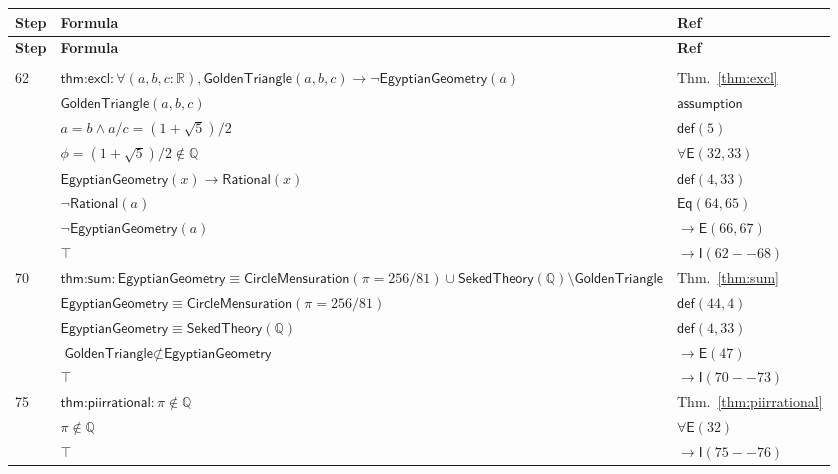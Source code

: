 \documentclass[12pt]{amsart}
\newcommand{\br}{,\allowbreak}
\newcommand{\R}{\mathbb{R}}
\newenvironment{prooftable}{%
	\renewcommand{\arraystretch}{1.2}%
	\setlength{\tabcolsep}{4pt}%
	\setlength{\arrayrulewidth}{0.05pt}
	\tiny
	\sloppy
	\begin{longtable}{
			|>{\centering\arraybackslash}m{0.7cm}|
			>{\raggedright\centering\arraybackslash}m{0.70\textwidth}|
			>{\centering\arraybackslash}m{3.5cm}|  %
		}%
		\hline
		\textbf{Step} & \centering\textbf{Formula} & \textbf{Ref} \\
		\hline
		\endfirsthead
		\hline
		\textbf{Step} & \centering\textbf{Formula} & \textbf{Ref} \\
		\hline
		\endhead
		\hline
		\multicolumn{3}{r}{\textit{Continued on next page}} \\
		\endfoot
		\hline
		\endlastfoot
	}{%
	\end{longtable}%
}
\newcommand{\thicksoliddoubleline}{%
	\noalign{\vskip1pt}%
	\noalign{\hrule height 0.2pt}%
	\noalign{\vskip0.2pt}%
	\noalign{\hrule height 0.2pt}%
	\noalign{\vskip1pt}%
}
\begin{document}
\begin{prooftable}
	\thicksoliddoubleline
	62 & $\textsf{thm:excl}: \forall(a \br b \br c:\R) \br  \textsf{GoldenTriangle}(a \br b \br c) \to \neg \textsf{EgyptianGeometry}(a)$ & Thm.~\ref{thm:excl} \\
	\hdashline
	63 & $\textsf{GoldenTriangle}(a \br b \br c)$ & $\mathsf{assumption}$ \\
	\hdashline
	64 & $a=b \land a/c = (1+\sqrt{5})/2$ & $\mathsf{def}(5)$ \\
	\hdashline
	65 & $\phi = (1+\sqrt{5})/2 \notin \mathbb{Q}$ & $\forall \mathsf{E}(32 \br 33)$ \\
	\hdashline
	66 & $\textsf{EgyptianGeometry}(x) \to \textsf{Rational}(x)$ & $\mathsf{def}(4 \br 33)$ \\
	\hdashline
	67 & $\neg \textsf{Rational}(a)$ & $\mathsf{Eq}(64 \br 65)$ \\
	\hdashline
	68 & $\neg \textsf{EgyptianGeometry}(a)$ & $\to \mathsf{E}(66 \br 67)$ \\
	\hdashline
	69 & $\top$ & $\to \mathsf{I}(62--68)$ \\
	
	\thicksoliddoubleline
	70 & $\textsf{thm:sum}: \textsf{EgyptianGeometry} \equiv \textsf{CircleMensuration}(\pi=256/81)\cup \textsf{SekedTheory}(\mathbb{Q})\setminus \textsf{GoldenTriangle}$ & Thm.~\ref{thm:sum} \\
	\hdashline
	71 & $\textsf{EgyptianGeometry} \equiv \textsf{CircleMensuration}(\pi=256/81)$ & $\mathsf{def}(44 \br 4)$ \\
	\hdashline
	72 & $\textsf{EgyptianGeometry} \equiv \textsf{SekedTheory}(\mathbb{Q})$ & $\mathsf{def}(4 \br 33)$ \\
	\hdashline
	73 & $\textsf{GoldenTriangle} \not\subset \textsf{EgyptianGeometry}$ & $\to \mathsf{E}(47)$ \\
	\hdashline
	74 & $\top$ & $\to \mathsf{I}(70--73)$ \\
	
	\thicksoliddoubleline
	75 & $\textsf{thm:piirrational}: \pi\notin\mathbb{Q}$ & Thm.~\ref{thm:piirrational} \\
	\hdashline
	76 & $\pi \notin \mathbb{Q}$ & $\forall \mathsf{E}(32)$ \\
	\hdashline
	77 & $\top$ & $\to \mathsf{I}(75--76)$ \\
	

\end{prooftable}
\end{document}
